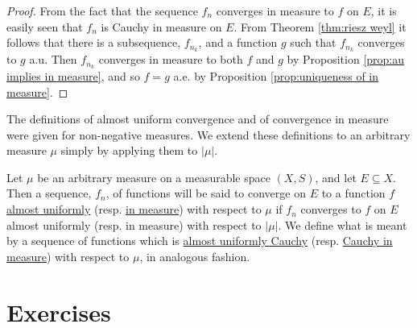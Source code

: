 \begin{proof}
From the fact that the sequence $f_n$ converges in measure to $f$ on $E$, it is easily seen that $f_n$ is Cauchy in measure on $E$. From Theorem \ref{thm:riesz weyl} it follows that there is a subsequence, $f_{n_k}$, and a function $g$ such that $f_{n_k}$ converges to $g$ a.u. Then $f_{n_k}$ converges in measure to both $f$ and $g$ by Proposition \ref{prop:au implies in measure}, and so $f=g$ a.e. by Proposition \ref{prop:uniqueness of in measure}.
\end{proof}

The definitions of almost uniform convergence and of convergence in measure were given for non-negative measures. We extend these definitions to an arbitrary measure $\mu$ simply by applying them to $|\mu|$.

\begin{definition}
Let $\mu$ be an arbitrary measure on a measurable space $(X, S)$, and let $E \subseteq X$. Then a sequence, $f_n$, of functions will be said to converge on $E$ to a function $f$ \underline{almost uniformly} (resp. \underline{in measure}) with respect to $\mu$ if $f_n$ converges to $f$ on $E$ almost uniformly (resp. in measure) with respect to $|\mu|$. We define what is meant by a sequence of functions which is \underline{almost uniformly Cauchy} (resp. \underline{Cauchy in measure}) with respect to $\mu$, in analogous fashion. 
\end{definition}

\section{Exercises}

